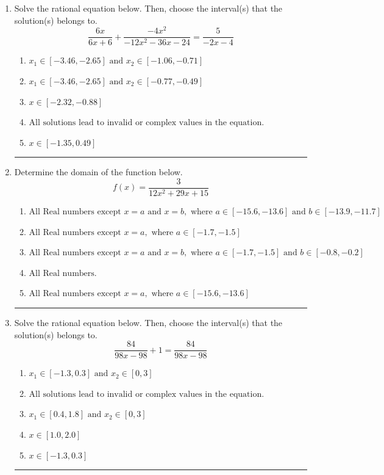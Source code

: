 \documentclass[14pt]{extbook}
\newcommand{\litem}[1]{\item#1\hspace*{-1cm}\rule{\textwidth}{0.4pt}}
\begin{document}
\begin{enumerate}
{\begin{enumerate}[label=\Alph*.]
\end{enumerate} }
\litem{
Solve the rational equation below. Then, choose the interval(s) that the solution(s) belongs to.\[ \frac{6x}{6x + 6} + \frac{-4x^{2}}{-12x^{2} -36 x -24} = \frac{5}{-2x -4} \]\begin{enumerate}[label=\Alph*.]
\item \( x_1 \in [-3.46, -2.65] \text{ and } x_2 \in [-1.06,-0.71] \)
\item \( x_1 \in [-3.46, -2.65] \text{ and } x_2 \in [-0.77,-0.49] \)
\item \( x \in [-2.32,-0.88] \)
\item \( \text{All solutions lead to invalid or complex values in the equation.} \)
\item \( x \in [-1.35,0.49] \)

\end{enumerate} }
\litem{
Determine the domain of the function below.\[ f(x) = \frac{3}{12x^{2} +29 x + 15} \]\begin{enumerate}[label=\Alph*.]
\item \( \text{All Real numbers except } x = a \text{ and } x = b, \text{ where } a \in [-15.6, -13.6] \text{ and } b \in [-13.9, -11.7] \)
\item \( \text{All Real numbers except } x = a, \text{ where } a \in [-1.7, -1.5] \)
\item \( \text{All Real numbers except } x = a \text{ and } x = b, \text{ where } a \in [-1.7, -1.5] \text{ and } b \in [-0.8, -0.2] \)
\item \( \text{All Real numbers.} \)
\item \( \text{All Real numbers except } x = a, \text{ where } a \in [-15.6, -13.6] \)

\end{enumerate} }
\litem{
Solve the rational equation below. Then, choose the interval(s) that the solution(s) belongs to.\[ \frac{84}{98x -98} + 1 = \frac{84}{98x -98} \]\begin{enumerate}[label=\Alph*.]
\item \( x_1 \in [-1.3, 0.3] \text{ and } x_2 \in [0,3] \)
\item \( \text{All solutions lead to invalid or complex values in the equation.} \)
\item \( x_1 \in [0.4, 1.8] \text{ and } x_2 \in [0,3] \)
\item \( x \in [1.0,2.0] \)
\item \( x \in [-1.3,0.3] \)


\end{enumerate}}
\end{enumerate}
\end{document}
